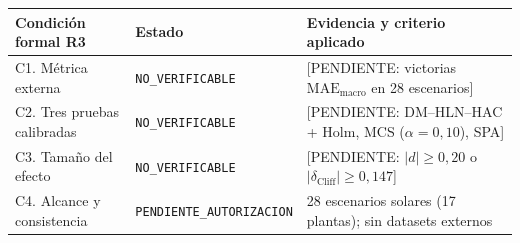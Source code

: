 \begin{tabular}{@{}p{3.6cm}p{2.6cm}p{5.5cm}@{}}
\toprule
Condición formal R3 & Estado & Evidencia y criterio aplicado \\
\midrule
C1. Métrica externa & \texttt{NO\_VERIFICABLE} & [PENDIENTE: victorias $\mathrm{MAE}_{\mathrm{macro}}$ en 28 escenarios] \\
C2. Tres pruebas calibradas & \texttt{NO\_VERIFICABLE} & [PENDIENTE: DM--HLN--HAC + Holm, MCS ($\alpha=0{,}10$), SPA] \\
C3. Tamaño del efecto & \texttt{NO\_VERIFICABLE} & [PENDIENTE: $|d| \ge 0{,}20$ o $|\delta_{\mathrm{Cliff}}| \ge 0{,}147$] \\
C4. Alcance y consistencia & \texttt{PENDIENTE\_AUTORIZACION} & 28 escenarios solares (17 plantas); sin datasets externos \\
\bottomrule
\end{tabular}
